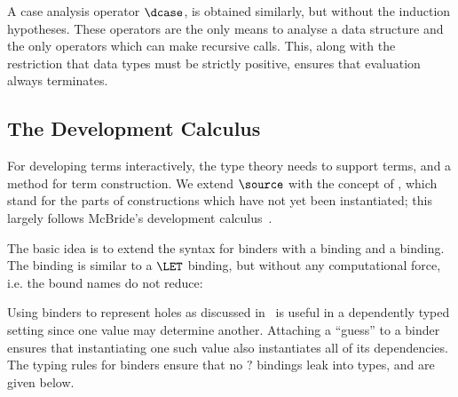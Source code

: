 A case analysis operator $\dcase$, is obtained similarly, but without
the induction hypotheses. These operators are the only means to
analyse a data structure and the only operators which can make
recursive calls. This, along with the restriction that data types must
be strictly positive, ensures that evaluation always terminates.

\subsection{The Development Calculus}

\label{sec:devcalc}

For developing terms interactively, the type theory needs to support
 terms, and a method for term construction. We
extend $\source$ with the concept of , which stand for
the parts of constructions which have not yet been instantiated; this
largely follows McBride's \Oleg{} development
calculus~\cite{mcbride-thesis}.

The basic idea is to extend the syntax for binders with a 
binding and a  binding. The  binding is
similar to a $\LET$ binding, but without any computational force,
i.e. the bound names do not reduce:


Using binders to represent holes as discussed in~\cite{mcbride-thesis}
is useful in a dependently typed setting since one value may determine
another. Attaching a ``guess'' to a binder ensures that instantiating one
such value also instantiates all of its dependencies. The typing rules for
binders ensure that no $?$ bindings leak into types, and are given
below.



